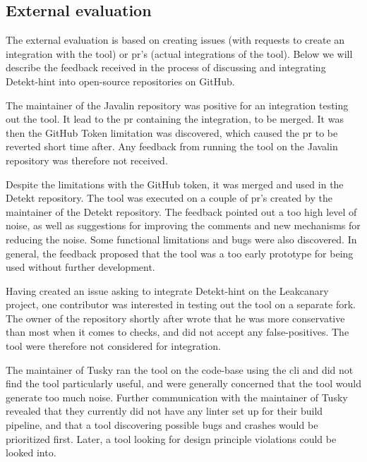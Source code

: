 \documentclass[pdftex,10pt,b5paper,twoside]{report}
\begin{document}
\subsection{External evaluation}
\label{evaluation-open-source}
The external evaluation is based on creating issues (with requests to create an integration with the tool) or \gls{pr}'s (actual integrations of the tool). Below we will describe the feedback received in the process of discussing and integrating Detekt-hint into open-source repositories on GitHub. 

The maintainer of the Javalin repository was positive for an integration testing out the tool. It lead to the \gls{pr} containing the integration, to be merged. It was then the GitHub Token limitation was discovered, which caused the \gls{pr} to be reverted short time after. Any feedback from running the tool on the Javalin repository was therefore not received. 

Despite the limitations with the GitHub token, it was merged and used in the Detekt repository. The tool was executed on a couple of \gls{pr}'s created by the maintainer of the Detekt repository. The feedback pointed out a too high level of noise, as well as suggestions for improving the comments and new mechanisms for reducing the noise. Some functional limitations and bugs were also discovered. In general, the feedback proposed that the tool was a too early prototype for being used without further development.

Having created an issue asking to integrate Detekt-hint on the Leakcanary project, one contributor was interested in testing out the tool on a separate fork. The owner of the repository shortly after wrote that he was more conservative than most when it comes to checks, and did not accept any false-positives. The tool were therefore not considered for integration.

The maintainer of Tusky\cite{tusky} ran the tool on the code-base using the \gls{cli} and did not find the tool particularly useful, and were generally concerned that the tool would generate too much noise. Further communication with the maintainer of Tusky revealed that they currently did not have any linter set up for their build pipeline, and that a tool discovering possible bugs and crashes would be prioritized first. Later, a tool looking for design principle violations could be looked into.
\end{document}
